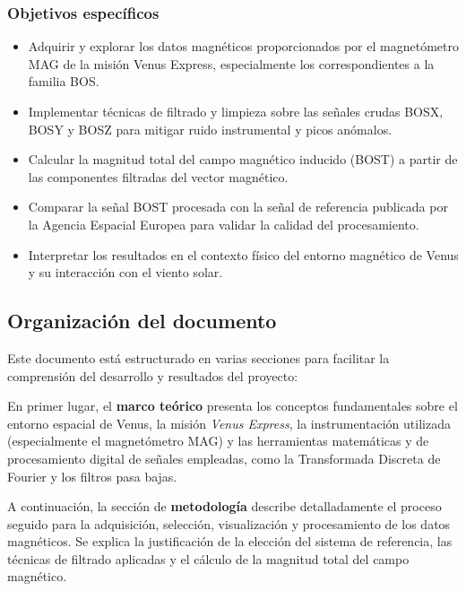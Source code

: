 \documentclass[letterpaper,11pt]{article}
\begin{document}
            \subsubsection{Objetivos específicos}
                \begin{itemize}
                    \item Adquirir y explorar los datos magnéticos proporcionados por el magnetómetro MAG de la misión Venus Express, especialmente los correspondientes a la familia BOS.
                    
                    \item Implementar técnicas de filtrado y limpieza sobre las señales crudas BOSX, BOSY y BOSZ para mitigar ruido instrumental y picos anómalos.
                    
                    \item Calcular la magnitud total del campo magnético inducido (BOST) a partir de las componentes filtradas del vector magnético.

                    \item Comparar la señal BOST procesada con la señal de referencia publicada por la Agencia Espacial Europea para validar la calidad del procesamiento.

                    \item Interpretar los resultados en el contexto físico del entorno magnético de Venus y su interacción con el viento solar.
                \end{itemize}

\newpage
        \subsection{Organización del documento}
            Este documento está estructurado en varias secciones para facilitar la comprensión del desarrollo y resultados del proyecto:

            En primer lugar, el \textbf{marco teórico} presenta los conceptos fundamentales sobre el entorno espacial de Venus, la misión \textit{Venus Express}, la instrumentación utilizada (especialmente el magnetómetro MAG) y las herramientas matemáticas y de procesamiento digital de señales empleadas, como la Transformada Discreta de Fourier y los filtros pasa bajas.

            A continuación, la sección de \textbf{metodología} describe detalladamente el proceso seguido para la adquisición, selección, visualización y procesamiento de los datos magnéticos. Se explica la justificación de la elección del sistema de referencia, las técnicas de filtrado aplicadas y el cálculo de la magnitud total del campo magnético.
\end{document}
